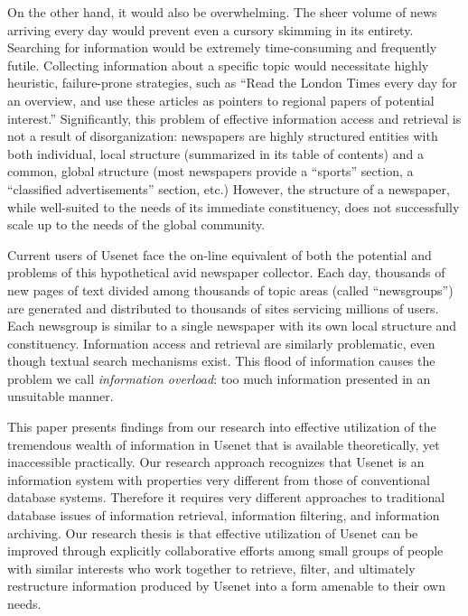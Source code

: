 On the other hand, it would also be overwhelming.  The sheer volume of news
arriving every day would prevent even a cursory skimming in its entirety.
Searching for information would be extremely time-consuming and frequently
futile.  Collecting information about a specific topic would necessitate highly
heuristic, failure-prone strategies, such as ``Read the London Times every day
for an overview, and use these articles as pointers to regional papers of
potential interest.''  Significantly, this problem of effective information
access and retrieval is not a result of disorganization: newspapers are highly
structured entities with both individual, local structure (summarized in its
table of contents) and a common, global structure (most newspapers provide a
``sports'' section, a ``classified advertisements'' section, etc.)  However,
the structure of a newspaper, while well-suited to the needs of its immediate
constituency, does not successfully scale up to the needs of the global
community.

Current users of Usenet face the on-line equivalent of both the potential and
problems of this hypothetical avid newspaper collector. Each day, thousands of
new pages of text divided among thousands of topic areas (called
``newsgroups'') are generated and distributed to thousands of sites servicing
millions of users.  Each newsgroup is similar to a single newspaper with its
own local structure and constituency.  Information access and retrieval are
similarly problematic, even though textual search mechanisms exist. This flood
of information causes the problem we call {\em information overload\/}: too
much information presented in an unsuitable manner.

This paper presents findings from our research into effective utilization of
the tremendous wealth of information in Usenet that is available theoretically,
yet inaccessible practically.  Our research approach recognizes that Usenet is
an information system with properties very different from those of conventional
database systems. Therefore it requires very different approaches to
traditional database issues of information retrieval, information filtering,
and information archiving.  Our research thesis is that effective utilization
of Usenet can be improved through explicitly collaborative efforts among small
groups of people with similar interests who work together to retrieve, filter,
and ultimately restructure information produced by Usenet into a form amenable
to their own needs.

